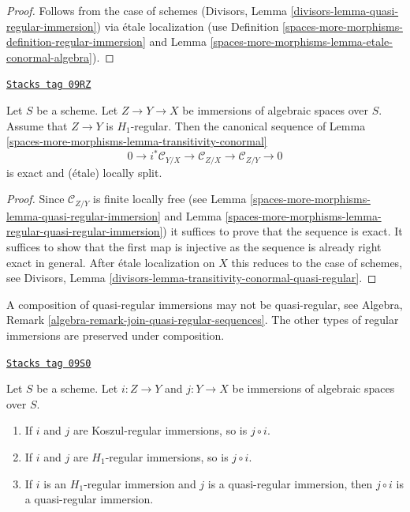 \begin{proof}
Follows from the case of schemes
(Divisors, Lemma \ref{divisors-lemma-quasi-regular-immersion})
via \'etale localization (use Definition \ref{spaces-more-morphisms-definition-regular-immersion}
and
Lemma \ref{spaces-more-morphisms-lemma-etale-conormal-algebra}).
\end{proof}

\begin{lemma}
\label{spaces-more-morphisms-lemma-transitivity-conormal-quasi-regular}
\href{https://stacks.math.columbia.edu/tag/09RZ}{\texttt{Stacks tag 09RZ}}

Let $S$ be a scheme. Let $Z \to Y \to X$ be immersions of algebraic spaces
over $S$. Assume that $Z \to Y$ is $H_1$-regular. Then the canonical
sequence of Lemma \ref{spaces-more-morphisms-lemma-transitivity-conormal}
$$
0 \to i^*\mathcal{C}_{Y/X} \to
\mathcal{C}_{Z/X} \to
\mathcal{C}_{Z/Y} \to 0
$$
is exact and (\'etale) locally split.
\end{lemma}

\begin{proof}
Since $\mathcal{C}_{Z/Y}$ is finite locally free (see
Lemma \ref{spaces-more-morphisms-lemma-quasi-regular-immersion}
and
Lemma \ref{spaces-more-morphisms-lemma-regular-quasi-regular-immersion})
it suffices to prove that the sequence is exact.
It suffices to show that the first map is injective
as the sequence is already right exact in general.
After \'etale localization on $X$ this reduces to the case
of schemes, see
Divisors, Lemma \ref{divisors-lemma-transitivity-conormal-quasi-regular}.
\end{proof}

A composition of quasi-regular immersions may not be quasi-regular, see
Algebra, Remark \ref{algebra-remark-join-quasi-regular-sequences}.
The other types of regular immersions are preserved under composition.

\begin{lemma}
\label{spaces-more-morphisms-lemma-composition-regular-immersion}
\href{https://stacks.math.columbia.edu/tag/09S0}{\texttt{Stacks tag 09S0}}

Let $S$ be a scheme. Let $i : Z \to Y$ and $j : Y \to X$ be immersions of
algebraic spaces over $S$.
\begin{enumerate}
\item If $i$ and $j$ are Koszul-regular immersions, so is $j \circ i$.
\item If $i$ and $j$ are $H_1$-regular immersions, so is $j \circ i$.
\item If $i$ is an $H_1$-regular immersion and $j$ is a quasi-regular
immersion, then $j \circ i$ is a quasi-regular immersion.
\end{enumerate}
\end{lemma}

